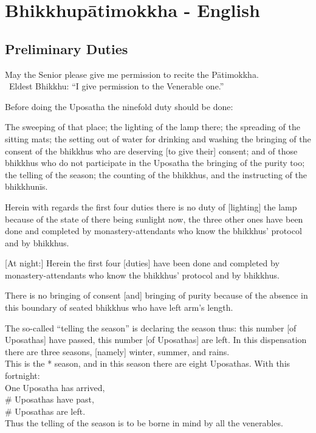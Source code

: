 

\chapter{Bhikkhupātimokkha - English}

\clearpage



\section{Preliminary Duties}
\label{preliminary-duties}

\begin{intro}
	May the Senior please give me permission to recite the Pātimokkha.\\
	\anglebracketleft\ \hspace{-0.5mm}Eldest Bhikkhu: ``I give permission to the Venerable one.'' \hspace{-0.5mm}\anglebracketright\
\end{intro}

Before doing the Uposatha the ninefold duty should be done:

The sweeping of that place; the lighting of the lamp there; the spreading of the sitting mats; the setting out of water for drinking and washing the bringing of the consent of the bhikkhus who are deserving [to give their] consent; and of those bhikkhus who do not participate in the Uposatha the bringing of the purity too; the telling of the season; the counting of the bhikkhus, and the instructing of the bhikkhunīs.

Herein with regards the first four duties there is no duty of [lighting] the lamp because of the state of there being sunlight now, the three other ones have been done and completed by monastery-attendants who know the bhikkhus' protocol and by bhikkhus.

	[At night:] Herein the first four [duties] have been done and completed by monastery-attendants who know the bhikkhus’ protocol and by bhikkhus.

There is no bringing of consent [and] bringing of purity because of the absence in this boundary of seated bhikkhus who have left arm's length.

The so-called ``telling the season'' is declaring the season thus: this number [of Uposathas] have passed, this number [of Uposathas] are left. In this dispensation there are three seasons, [namely] winter, summer, and rains.\\
This is the * season, and in this season there are eight Uposathas. With this fortnight:\\
One Uposatha has arrived,\\
\# Uposathas have past,\\
\# Uposathas are left.\\
Thus the telling of the season is to be borne in mind by all the venerables.

